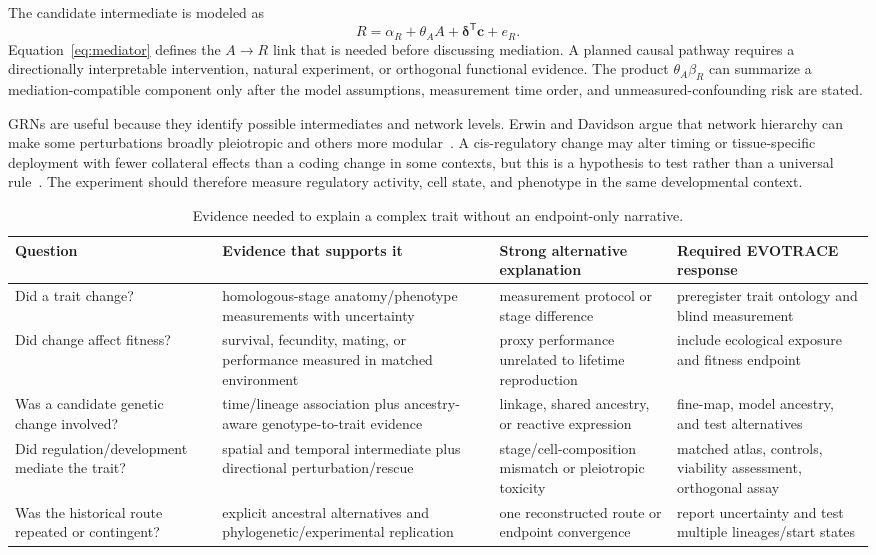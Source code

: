 \documentclass[conference]{IEEEtran}
\begin{document}
The candidate intermediate is modeled as
\begin{equation}
R=\alpha_R+\theta_A A+\boldsymbol{\delta}^{\mathsf{T}}\mathbf{c}+e_R.
\label{eq:mediator}
\end{equation}
Equation~\eqref{eq:mediator} defines the $A\rightarrow R$ link that is needed before discussing mediation. A planned causal pathway requires a directionally interpretable intervention, natural experiment, or orthogonal functional evidence. The product $\theta_A\beta_R$ can summarize a mediation-compatible component only after the model assumptions, measurement time order, and unmeasured-confounding risk are stated.

GRNs are useful because they identify possible intermediates and network levels. Erwin and Davidson argue that network hierarchy can make some perturbations broadly pleiotropic and others more modular~\cite{erwindavidson2009}. A cis-regulatory change may alter timing or tissue-specific deployment with fewer collateral effects than a coding change in some contexts, but this is a hypothesis to test rather than a universal rule~\cite{stern2008}. The experiment should therefore measure regulatory activity, cell state, and phenotype in the same developmental context.

\begin{table}[t]
\caption{Evidence needed to explain a complex trait without an endpoint-only narrative.}
\label{tab:complex}
\centering
\footnotesize
\begin{tabular}{L{0.17\textwidth} L{0.25\textwidth} L{0.28\textwidth} L{0.21\textwidth}}
\toprule
\textbf{Question} & \textbf{Evidence that supports it} & \textbf{Strong alternative explanation} & \textbf{Required EVOTRACE response}\\
\midrule
Did a trait change? & homologous-stage anatomy/phenotype measurements with uncertainty & measurement protocol or stage difference & preregister trait ontology and blind measurement\\
Did change affect fitness? & survival, fecundity, mating, or performance measured in matched environment & proxy performance unrelated to lifetime reproduction & include ecological exposure and fitness endpoint\\
Was a candidate genetic change involved? & time/lineage association plus ancestry-aware genotype-to-trait evidence & linkage, shared ancestry, or reactive expression & fine-map, model ancestry, and test alternatives\\
Did regulation/development mediate the trait? & spatial and temporal intermediate plus directional perturbation/rescue & stage/cell-composition mismatch or pleiotropic toxicity & matched atlas, controls, viability assessment, orthogonal assay\\
Was the historical route repeated or contingent? & explicit ancestral alternatives and phylogenetic/experimental replication & one reconstructed route or endpoint convergence & report uncertainty and test multiple lineages/start states\\
\bottomrule
\end{tabular}
\end{table}
\end{document}
